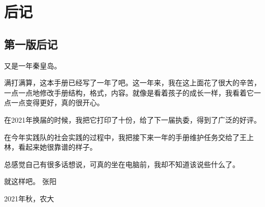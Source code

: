 \documentclass{ctexbook}
\begin{document}
\chapter{后记}
\section{第一版后记}
又是一年秦皇岛。

满打满算，这本手册已经写了一年了吧。这一年来，我在这上面花了很大的辛苦，一点一点地修改手册结构，格式，内容。就像是看着孩子的成长一样，我看着它一点一点变得更好，真的很开心。

在2021年换届的时候，我把它打印了十份，给了下一届执委，得到了广泛的好评。

在今年实践队的社会实践的过程中，我把接下来一年的手册维护任务交给了王上林，看起来她很靠谱的样子。

总感觉自己有很多话想说，可真的坐在电脑前，我却不知道该说些什么了。

就这样吧。
\hfill 张\hspace{3mm}阳 \hspace{10mm}

\hfill 2021年秋，农大\hspace{2mm}
\end{document}
